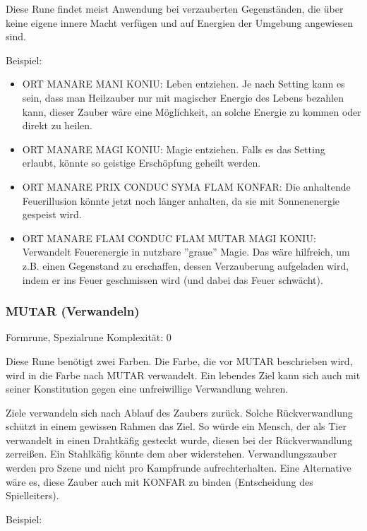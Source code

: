 \documentclass{article}
\begin{document}
Diese Rune findet meist Anwendung bei verzauberten Gegenständen, die über keine eigene innere Macht verfügen und auf
Energien der Umgebung angewiesen sind.

Beispiel:

\begin{itemize}
\item ORT MANARE MANI KONIU: Leben entziehen. Je nach Setting kann es sein, dass man Heilzauber nur mit magischer Energie des Lebens bezahlen kann, dieser Zauber wäre eine Möglichkeit, an solche Energie zu kommen oder direkt zu heilen.
\item ORT MANARE MAGI KONIU: Magie entziehen. Falls es das Setting erlaubt, könnte so geistige Erschöpfung geheilt werden.
\item ORT MANARE PRIX CONDUC SYMA FLAM KONFAR: Die anhaltende Feuerillusion könnte jetzt noch länger anhalten, da sie mit Sonnenenergie gespeist wird.
\item ORT MANARE FLAM CONDUC FLAM MUTAR MAGI KONIU: Verwandelt Feuerenergie in nutzbare ''graue'' Magie. Das wäre hilfreich, um z.B. einen Gegenstand zu erschaffen, dessen Verzauberung aufgeladen wird, indem er ins Feuer geschmissen wird (und dabei das Feuer schwächt).
\end{itemize}

\subsubsection{MUTAR (Verwandeln)}

Formrune, Spezialrune Komplexität: 0

Diese Rune benötigt zwei Farben. Die Farbe, die vor MUTAR beschrieben wird, wird in die Farbe nach MUTAR verwandelt.
Ein lebendes Ziel kann sich auch mit seiner Konstitution gegen eine unfreiwillige Verwandlung wehren.

Ziele verwandeln sich nach Ablauf des Zaubers zurück. Solche Rückverwandlung schützt in einem gewissen Rahmen das Ziel.
So würde ein Mensch, der als Tier verwandelt in einen Drahtkäfig gesteckt wurde, diesen bei der Rückverwandlung
zerreißen. Ein Stahlkäfig könnte dem aber widerstehen. Verwandlungszauber werden pro Szene und nicht pro Kampfrunde
aufrechterhalten. Eine Alternative wäre es, diese Zauber auch mit KONFAR zu binden (Entscheidung des Spielleiters).

Beispiel:
\end{document}
